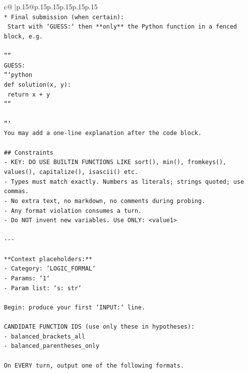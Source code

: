 \documentclass{article}
\begin{document}
{\begin{supertabular}{c@{$\;$}|p{.15\linewidth}@{}p{.15\linewidth}p{.15\linewidth}p{.15\linewidth}p{.15\linewidth}p{.15\linewidth}}
{{{\\ 
\texttt{* Final submission (when certain):} \\
\texttt{  Start with `GUESS:` then **only** the Python function in a fenced block, e.g.} \\
\\ 
\texttt{````} \\
\texttt{GUESS:} \\
\texttt{```python} \\
\texttt{def solution(x, y):} \\
\texttt{    return x + y} \\
\texttt{````} \\
\\ 
\texttt{```} \\
\texttt{You may add a one{-}line explanation after the code block.} \\
\\ 
\texttt{\#\# Constraints} \\
\texttt{{-} KEY: DO USE BUILTIN FUNCTIONS LIKE sort(), min(), fromkeys(), values(), capitalize(), isascii() etc.} \\
\texttt{{-} Types must match exactly. Numbers as literals; strings quoted; use commas.} \\
\texttt{{-} No extra text, no markdown, no comments during probing.} \\
\texttt{{-} Any format violation consumes a turn.} \\
\texttt{{-} Do NOT invent new variables. Use ONLY: <value1>} \\
\\ 
\texttt{{-}{-}{-}} \\
\\ 
\texttt{**Context placeholders:**} \\
\texttt{{-} Category: `LOGIC\_FORMAL`} \\
\texttt{{-} Params: `1`} \\
\texttt{{-} Param list: `s: str`} \\
\\ 
\texttt{Begin: produce your first `INPUT:` line.} \\
\\ 
\texttt{CANDIDATE FUNCTION IDS (use only these in hypotheses):} \\
\texttt{{-} balanced\_brackets\_all} \\
\texttt{{-} balanced\_parentheses\_only} \\
\\ 
\texttt{On EVERY turn, output one of the following formats.} \\
}}}
\end{supertabular}}
\end{document}

